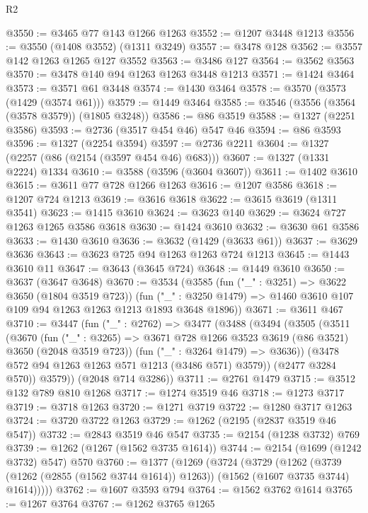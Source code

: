 \begin{lexlean}{R2}
\begin{coremodule}
@3550 := @3465 @77 @143 @1266 @1263
@3552 := @1207 @3448 @1213
@3556 := @3550 (@1408 @3552) (@1311 @3249)
@3557 := @3478 @128
@3562 := @3557 @142 @1263 @1265 @127 @3552
@3563 := @3486 @127
@3564 := @3562 @3563
@3570 := @3478 @140 @94 @1263 @1263 @3448 @1213
@3571 := @1424 @3464
@3573 := @3571 @61 @3448
@3574 := @1430 @3464
@3578 := @3570 (@3573 (@1429 (@3574 @61)))
@3579 := @1449 @3464
@3585 := @3546 (@3556 (@3564 (@3578 @3579)) (@1805 @3248))
@3586 := @86 @3519
@3588 := @1327 (@2251 @3586)
@3593 := @2736 (@3517 @454 @46) @547 @46
@3594 := @86 @3593
@3596 := @1327 (@2254 @3594)
@3597 := @2736 @2211
@3604 := @1327 (@2257 (@86 (@2154 (@3597 @454 @46) @683)))
@3607 := @1327 (@1331 @2224) @1334
@3610 := @3588 (@3596 (@3604 @3607))
@3611 := @1402 @3610
@3615 := @3611 @77 @728 @1266 @1263
@3616 := @1207 @3586
@3618 := @1207 @724 @1213
@3619 := @3616 @3618
@3622 := @3615 @3619 (@1311 @3541)
@3623 := @1415 @3610
@3624 := @3623 @140
@3629 := @3624 @727 @1263 @1265 @3586 @3618
@3630 := @1424 @3610
@3632 := @3630 @61 @3586
@3633 := @1430 @3610
@3636 := @3632 (@1429 (@3633 @61))
@3637 := @3629 @3636
@3643 := @3623 @725 @94 @1263 @1263 @724 @1213
@3645 := @1443 @3610 @11
@3647 := @3643 (@3645 @724)
@3648 := @1449 @3610
@3650 := @3637 (@3647 @3648)
@3670 := @3534
    (@3585
      (fun ("_" : @3251) => @3622 @3650 (@1804 @3519 @723))
      (fun ("_" : @3250 @1479) => @1460 @3610 @107 @109 @94 @1263 @1263 @1213 @1893 @3648 @1896))
@3671 := @3611 @467
@3710 := @3447
    (fun ("_" : @2762) =>
    @3477
      (@3488
        (@3494
          (@3505
            (@3511
              (@3670
                (fun ("_" : @3265) =>
                @3671 @728 @1266 @3523 @3619 (@86 @3521) @3650 (@2048 @3519 @723))
                (fun ("_" : @3264 @1479) => @3636))
              (@3478 @572 @94 @1263 @1263 @571 @1213 (@3486 @571) @3579))
            (@2477 @3284 @570))
          @3579))
      (@2048 @714 @3286))
@3711 := @2761 @1479
@3715 := @3512 @132 @789 @810 @1268
@3717 := @1274 @3519 @46
@3718 := @1273 @3717
@3719 := @3718 @1263
@3720 := @1271 @3719
@3722 := @1280 @3717 @1263
@3724 := @3720 @3722 @1263
@3729 := @1262 (@2195 (@2837 @3519 @46 @547))
@3732 := @2843 @3519 @46 @547
@3735 := @2154 (@1238 @3732) @769
@3739 := @1262 (@1267 (@1562 @3735 @1614))
@3744 := @2154 (@1699 (@1242 @3732) @547) @570
@3760 := @1377
    (@1269
      (@3724
        (@3729
          (@1262
            (@3739 (@1262 (@2855 (@1562 @3744 @1614)) @1263))
            (@1562 (@1607 @3735 @3744) @1614)))))
@3762 := @1607 @3593 @794
@3764 := @1562 @3762 @1614
@3765 := @1267 @3764
@3767 := @1262 @3765 @1265

\end{coremodule}
\end{lexlean}
